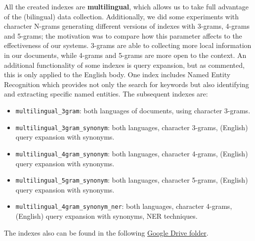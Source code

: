 All the created indexes are \textbf{multilingual}, which allows us to take full advantage of the (bilingual) data
collection.
Additionally, we did some experiments with character N-grams generating different versions of indexes with 3-grams,
4-grams and 5-grams;
the motivation was to compare how this parameter affects to the effectiveness of our systems.
3-grams are able to collecting more local information in our documents, while 4-grams and 5-grams are more open to
the context.
An additional functionality of some indexes is query expansion, but as commented, this is only applied to the English
body.
One index includes Named Entity Recognition which provides not only the search for keywords but also identifying and
extracting specific named entities.
The subsequent indexes are:
\begin{itemize}
	\item \texttt{multilingual\_3gram}: both languages of documents, using character 3-grams.
	\item \texttt{multilingual\_3gram\_synonym}: both languages, character 3-grams, (English) query expansion with synonyms.
	\item \texttt{multilingual\_4gram\_synonym}: both languages, character 4-grams, (English) query expansion with synonyms.
	\item \texttt{multilingual\_5gram\_synonym}: both languages, character 5-grams, (English) query expansion with synonyms.
	\item \texttt{multilingual\_4gram\_synonym\_ner}: both languages, character 4-grams, (English) query expansion with synonyms, NER techniques.
\end{itemize}
The indexes also can be found in the following
\href{https://drive.google.com/drive/folders/1CK_kLeZ5Us3VJe8hiG1vhwPrDs94cLvU?usp=share_link}{Google Drive folder}.\\

